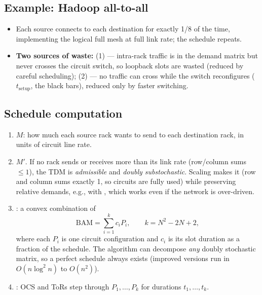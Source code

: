 \subsection{Example: Hadoop all-to-all}
\begin{itemize}
\item Each source connects to each destination for exactly 1/8 of the time, implementing the logical full mesh at full link rate; the schedule repeats.
\item \textbf{Two sources of waste:} (1)  --- intra-rack traffic is in the demand matrix but never crosses the circuit switch, so loopback slots are wasted (reduced by careful scheduling); (2)  --- no traffic can cross while the switch reconfigures ($t_{\text{setup}}$, the black bars), reduced only by faster switching.
\end{itemize}

\subsection{Schedule computation}
\begin{enumerate}
\item {} $M$: how much each source rack wants to send to each destination rack, in units of circuit line rate.
\item {} $M'$. If no rack sends or receives more than its link rate (row/column sums $\le 1$), the TDM is \emph{admissible} and \emph{doubly substochastic}. Scaling makes it  (row and column sums exactly 1, so circuits are fully used) while preserving relative demands, e.g., with , which works even if the network is over-driven.
\item {}: a convex combination of 
\[ \text{BAM}=\sum_{i=1}^{k} c_i P_i, \qquad k=N^2-2N+2, \]
where each $P_i$ is one circuit configuration and $c_i$ is its slot duration as a fraction of the schedule. The  algorithm can decompose \emph{any} doubly stochastic matrix, so a perfect schedule always exists (improved versions run in $O(n\log^2 n)$ to $O(n^2)$).
\item {}: OCS and ToRs step through $P_1,\ldots,P_k$ for durations $t_1,\ldots,t_k$.
\end{enumerate}

